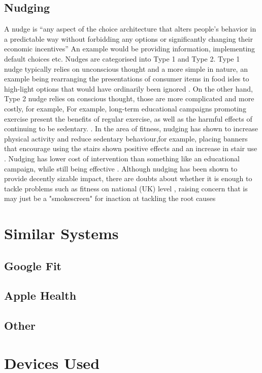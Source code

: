 \subsection{Nudging}
A nudge is “any aspect of the choice architecture that alters people's behavior in a predictable way without forbidding any options or significantly changing their economic incentives” \cite{nudgeDef} An example would be providing information, implementing default choices etc. Nudges are categorised into Type 1 and Type 2. Type 1 nudge typically relies on unconscious thought and a more simple in nature, an example being  rearranging  the presentations of consumer items in food isles to high-light options that would have ordinarily been ignored \cite{NudgeCritical}. On the other hand, Type 2 nudge relies on conscious thought, those are more complicated and more costly, for example, For example, long-term educational campaigns promoting exercise present the benefits of regular exercise, as well as the harmful effects of continuing to be sedentary. \cite{NudgeCritical}.  In the area of fitness, nudging has shown to increase physical activity and reduce sedentary behaviour,for example, placing banners that encourage using the stairs shown positive effects and an increase in stair use \cite{FORBERGER2022106922, Forberger2019}. Nudging has lower cost of intervention than something like an educational campaign, while still being effective \cite{nudgeCost}. Although nudging has been shown to provide decently sizable impact, there are doubts about whether it is enough to tackle problems such as fitness on national (UK) level , raising concern that is may just be a "smokescreen" for inaction at tackling the root causes  \cite{Raynerd2177}
\section{Similar Systems}
\label{section:similarSystems}
\subsection{Google Fit}
\subsection{Apple Health}
\subsection{Other}
\section{Devices Used}
